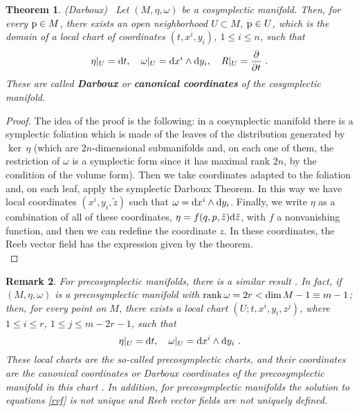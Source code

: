 \documentclass[12pt]{report}
\newtheorem{teor}{Theorem}[chapter]
\newtheorem{remark}[teor]{Remark}
\def\derpar#1#2{\frac{\partial{#1}}{\partial{#2}}}
\def\qed{\ifvmode\removelastskip\fi
{\unskip\nobreak\hfil\penalty50\hbox{}\nobreak\hfil
\hbox{\vrule height1.2ex width1.2ex}\parfillskip=0pt
\finalhyphendemerits=0 \par\smallskip}}
\def\d{{\rm d}}
\begin{document}
\begin{teor} {\rm (Darboux)} \
Let $(M,\eta,\omega)$ be a cosymplectic manifold.
 Then, for every ${\rm p}\in M$, there exists an open neighborhood $U \subset M$, ${\rm p}\in U$, 
which is the domain of a local chart of coordinates $(t,x^i,y_i)$, 
$1\leq i \leq n$, such that
$$
\eta\vert_U=\d t ,\quad 
\omega\vert_U=\d x^i\wedge\d y_i
,\quad R\vert_U=\derpar{}{t} \ .
$$
These are called \textbf{Darboux} or \textbf{canonical coordinates}
of the cosymplectic manifold.
\label{darbo}
\end{teor}
\begin{proof}
The idea of the proof is the following:
in a cosymplectic manifold there is a symplectic foliation
which is made of  the leaves of the distribution generated by $\ker\,\eta$
(which are $2n$-dimensional submanifolds and, on each one of them, the restriction of $\omega$ is a symplectic form
since it has maximal rank $2n$, by the condition of the volume form).
Then we take coordinates adapted to the foliation and,
on each leaf, apply the symplectic Darboux Theorem.
In this way we have local coordinates $(x^i,y_i,\tilde z)$
such that $\omega=\d x^i\wedge\d y_i$.
Finally, we write $\eta$ as a combination of all of these coordinates,
$\eta=f(q,p,\tilde z)\d\tilde z$,
with $f$ a nonvanishing function, and then we can redefine the coordinate $z$.
In these coordinates, the Reeb vector field has the expression given by the theorem.
\\ \qed \end{proof}

\begin{remark}{\rm 
For precosymplectic manifolds, there is a similar result   \cite{dLe89}.
In fact, if $(M,\eta,\omega)$ is a precosymplectic manifold with ${\rm rank}\,\omega=2r<{\rm dim}\,M-1\equiv m-1$; then,
for every point on $M$, there exists a local chart $(U; t, x^i, y_i, z^j)$, where $1\leq i\leq r$, $1\leq j\leq m-2r-1$, such that
\begin{equation*}
\eta\vert_U=\d t,\quad\omega\vert_U=\d x^i\wedge\d y_i \ .
\end{equation*}
These local charts are the so-called {\sl precosymplectic charts},
and their coordinates are the {\sl canonical coordinates} or 
{\sl  Darboux coordinates} of the precosymplectic manifold in this chart \cite{dLGRR-2023}.
In addition, for precosymplectic manifolds the solution to equations \eqref{rvf} is not unique
and Reeb vector fields are not uniquely defined.
}\end{remark}
\end{document}
